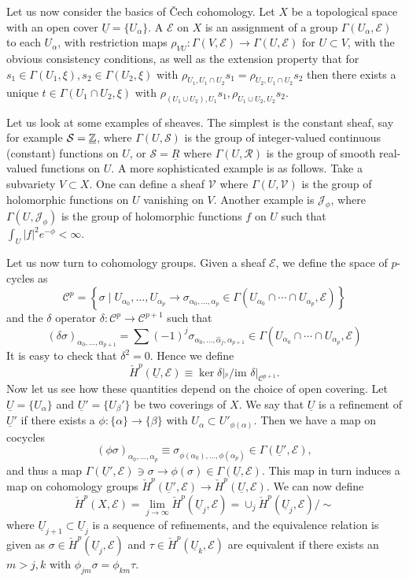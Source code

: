 \documentclass{../mathnotes}
\begin{document}
Let us now consider the basics of \v{C}ech cohomology. Let $X$ be a topological space with an open cover $\underline{U}=\{U_\alpha\}$.
A  $\mathcal{E}$ on $X$ is an assignment of a group $\Gamma(U_\alpha,\mathcal{E})$ to each $U_\alpha$, with restriction
maps $\rho_{VU}:\Gamma(V,\mathcal{E})\to\Gamma(U,\mathcal{E})$ for $U\subset V$, with the obvious consistency conditions, as well as the
extension property that for $s_1\in \Gamma(U_1,\xi),s_2\in\Gamma(U_2,\xi)$ with $\rho_{U_1,U_1\cap U_2}s_1=\rho_{U_2,U_1\cap U_2}s_2$
then there exists a unique $t\in\Gamma(U_1\cap U_2,\xi)$ with $\rho_{(U_1\cup U_2),U_1}s_1,\rho_{U_1\cup U_2,U_2}s_2$.

Let us look at some examples of sheaves. The simplest is the constant sheaf, say for example $\mathcal{S}=\underline{\mathbb{Z}}$,
where $\Gamma(U,\mathcal{S})$ is the group of integer-valued continuous (constant) functions on $U$, or $\mathcal{S}=\underline{R}$
where $\Gamma(U,\mathcal{R})$ is the group of smooth real-valued functions on $U$. A more sophisticated example is as follows.
Take a subvariety $V\subset X$. One can define a sheaf $\mathcal{V}$ where $\Gamma(U,\mathcal{V})$ is the group of holomorphic
functions on $U$ vanishing on $V$. Another example is $\mathcal{J}_\phi$, where $\Gamma(U,\mathcal{J}_\phi)$ is the group
of holomorphic functions $f$ on $U$ such that $\int_U |f|^2e^{-\phi}<\infty$.

Let us now turn to cohomology groups. Given a sheaf $\mathcal{E}$, we define the space of $p$-cycles as
\[\mathcal{C}^p=\left\{ \sigma\mid U_{\alpha_0},\ldots,U_{\alpha_p}\to \sigma_{\alpha_0,\ldots,\alpha_p}\in\Gamma(U_{\alpha_0}\cap\cdots\cap U_{\alpha_p},\mathcal{E}) \right\}\]
and the $\delta$ operator $\delta:\mathcal{C}^p\to\mathcal{C}^{p+1}$ such that
\[(\delta\sigma)_{\alpha_0,\ldots,\alpha_{p+1}}=\sum(-1)^j\sigma_{\alpha_0,\ldots,\hat\alpha_j,\alpha_{p+1}}\in\Gamma(U_{\alpha_0}\cap\cdots\cap U_{\alpha_p},\mathcal{E})\]
It is easy to check that $\delta^2=0$. Hence we define
\[\check H^p(\underline{U},\mathcal{E})\equiv \ker\delta|_{\mathcal{}^p}/\text{im }\delta|_{\mathcal{C}^{p+1}}.\]
Now let us see how these quantities depend on the choice of open covering. Let $\underline{U}=\{U_\alpha\}$ and $\underline{U}'=\{U_\beta'\}$ be
two coverings of $X$. We say that $\underline{U}$ is a refinement of $\underline{U}'$ if there exists a $\phi:\{\alpha\}\to\{\beta\}$ with
$U_\alpha\subset U'_{\phi(\alpha)}$. Then we have a map on cocycles
\[(\phi\sigma)_{\alpha_0,\ldots,\alpha_p}\equiv\sigma_{\phi(\alpha_0),\ldots,\phi(\alpha_p)}\in\Gamma(\underline{U}',\mathcal{E}),\]
and thus a map $\Gamma(\underline{U}',\mathcal{E})\ni\sigma\to \phi(\sigma)\in\Gamma(\underline{U},\mathcal{E})$. This map in turn
induces a map on cohomology groups $\check H^p(\underline{U}',\mathcal{E})\to\check H^p(\underline{U},\mathcal{E})$.
We can now define
\[\check H^p(X,\mathcal{E})=\lim_{j\to\infty}\check H^p(\underline{U}_j,\mathcal{E})=\cup_j\check H^p(\underline{U}_j,\mathcal{E})/\sim\]
where $\underline{U}_{j+1}\subset\underline{U}_j$ is a sequence of refinements, and the equivalence relation is given as $\sigma\in \check H^p(\underline{U}_j,\mathcal{E})$
and $\tau\in \check H^p(\underline{U}_k,\mathcal{E})$ are equivalent if there exists an $m>j,k$ with $\phi_{jm}\sigma=\phi_{km}\tau$.
\end{document}
